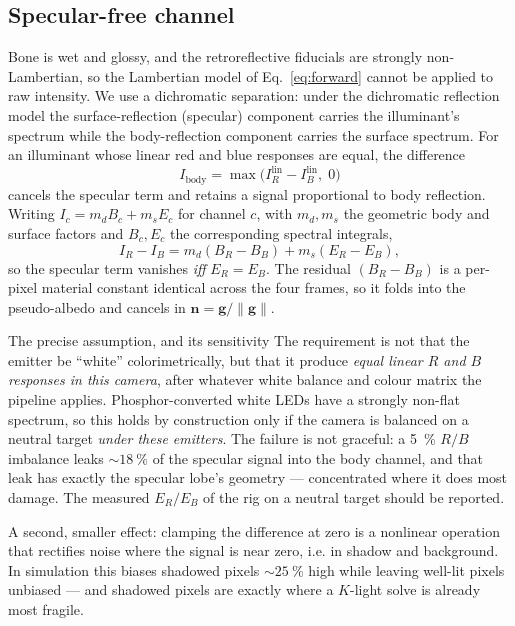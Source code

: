 \documentclass[journal,10pt]{IEEEtran}
\newcommand{\vecn}{\bm{n}}
\newcommand{\vecg}{\bm{g}}
\begin{document}
\subsection{Specular-free channel}
Bone is wet and glossy, and the retroreflective fiducials are strongly
non-Lambertian, so the Lambertian model of Eq.~\eqref{eq:forward} cannot be
applied to raw intensity. We use a dichromatic separation: under the dichromatic
reflection model the surface-reflection (specular) component carries the
illuminant's spectrum while the body-reflection component carries the surface
spectrum. For an illuminant whose linear red and blue responses are equal, the
difference
\begin{equation}
I_\mathrm{body} = \max\bigl(I_R^{\mathrm{lin}} - I_B^{\mathrm{lin}},\; 0\bigr)
\end{equation}
cancels the specular term and retains a signal proportional to body reflection.
Writing $I_c = m_d B_c + m_s E_c$ for channel $c$, with $m_d, m_s$ the geometric
body and surface factors and $B_c, E_c$ the corresponding spectral integrals,
\begin{equation}
I_R - I_B = m_d(B_R - B_B) + m_s(E_R - E_B),
\end{equation}
so the specular term vanishes \emph{iff} $E_R = E_B$. The residual
$(B_R-B_B)$ is a per-pixel material constant identical across the four frames,
so it folds into the pseudo-albedo and cancels in
$\vecn = \vecg/\lVert\vecg\rVert$.

\begin{notebox}{The precise assumption, and its sensitivity}
The requirement is not that the emitter be ``white'' colorimetrically, but that
it produce \emph{equal linear $R$ and $B$ responses in this camera}, after
whatever white balance and colour matrix the pipeline applies. Phosphor-converted
white LEDs have a strongly non-flat spectrum, so this holds by construction only
if the camera is balanced on a neutral target \emph{under these emitters}.
The failure is not graceful: a \SI{5}{\percent} $R/B$ imbalance leaks
${\sim}\SI{18}{\percent}$ of the specular signal into the body channel, and that
leak has exactly the specular lobe's geometry --- concentrated where it does most
damage. The measured $E_R/E_B$ of the rig on a neutral target should be reported.

A second, smaller effect: clamping the difference at zero is a nonlinear
operation that rectifies noise where the signal is near zero, i.e. in shadow and
background. In simulation this biases shadowed pixels ${\sim}\SI{25}{\percent}$
high while leaving well-lit pixels unbiased --- and shadowed pixels are exactly
where a $K$-light solve is already most fragile.
\end{notebox}
\end{document}
